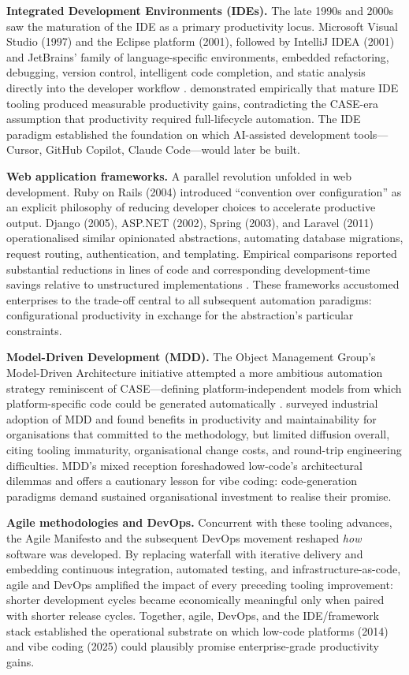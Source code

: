 \documentclass[preprint,12pt,authoryear]{elsarticle}
\begin{document}
\textbf{Integrated Development Environments (IDEs).} The late 1990s and 2000s saw the maturation of the IDE as a primary productivity locus. Microsoft Visual Studio (1997) and the Eclipse platform (2001), followed by IntelliJ IDEA (2001) and JetBrains' family of language-specific environments, embedded refactoring, debugging, version control, intelligent code completion, and static analysis directly into the developer workflow \citep{Murphy2006, Storey2005}. \citet{Murphy2006} demonstrated empirically that mature IDE tooling produced measurable productivity gains, contradicting the CASE-era assumption that productivity required full-lifecycle automation. The IDE paradigm established the foundation on which AI-assisted development tools---Cursor, GitHub Copilot, Claude Code---would later be built.

\textbf{Web application frameworks.} A parallel revolution unfolded in web development. Ruby on Rails (2004) introduced ``convention over configuration'' as an explicit philosophy of reducing developer choices to accelerate productive output. Django (2005), ASP.NET (2002), Spring (2003), and Laravel (2011) operationalised similar opinionated abstractions, automating database migrations, request routing, authentication, and templating. Empirical comparisons reported substantial reductions in lines of code and corresponding development-time savings relative to unstructured implementations \citep{Plekhanova2009}. These frameworks accustomed enterprises to the trade-off central to all subsequent automation paradigms: configurational productivity in exchange for the abstraction's particular constraints.

\textbf{Model-Driven Development (MDD).} The Object Management Group's Model-Driven Architecture initiative \citep{OMG2003} attempted a more ambitious automation strategy reminiscent of CASE---defining platform-independent models from which platform-specific code could be generated automatically \citep{Schmidt2006}. \citet{Hutchinson2011} surveyed industrial adoption of MDD and found benefits in productivity and maintainability for organisations that committed to the methodology, but limited diffusion overall, citing tooling immaturity, organisational change costs, and round-trip engineering difficulties. MDD's mixed reception foreshadowed low-code's architectural dilemmas \citep{Cabot2020} and offers a cautionary lesson for vibe coding: code-generation paradigms demand sustained organisational investment to realise their promise.

\textbf{Agile methodologies and DevOps.} Concurrent with these tooling advances, the Agile Manifesto \citep{AgileManifesto2001} and the subsequent DevOps movement \citep{Humble2010, Forsgren2018} reshaped \emph{how} software was developed. By replacing waterfall with iterative delivery and embedding continuous integration, automated testing, and infrastructure-as-code, agile and DevOps amplified the impact of every preceding tooling improvement: shorter development cycles became economically meaningful only when paired with shorter release cycles. Together, agile, DevOps, and the IDE/framework stack established the operational substrate on which low-code platforms (2014) and vibe coding (2025) could plausibly promise enterprise-grade productivity gains.
\end{document}
